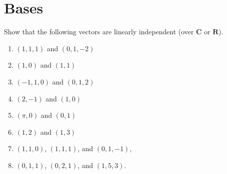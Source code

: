 \section{Bases}

\setcounter{exercise}{0}

\begin{exercise}
    Show that the following vectors are linearly independent (over $\mathbf{C}$ or $\mathbf{R}$).
    \begin{enumerate}[label={(\alph*)},itemsep=0pt]
        \item $(1, 1, 1)$ and $(0, 1, -2)$
        \item $(1, 0)$ and $(1, 1)$
        \item $(-1, 1, 0)$ and $(0, 1, 2)$
        \item $(2, -1)$ and $(1, 0)$
        \item $(\pi, 0)$ and $(0, 1)$
        \item $(1, 2)$ and $(1, 3)$
        \item $(1, 1, 0)$, $(1, 1, 1)$, and $(0, 1, -1)$,
        \item $(0, 1, 1)$, $(0, 2, 1)$, and $(1, 5, 3)$.
    \end{enumerate}
\end{exercise}

